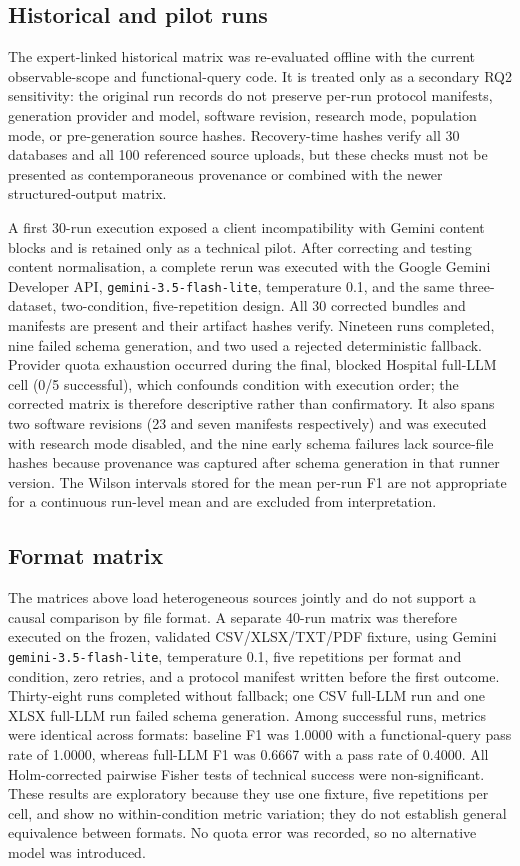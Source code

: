 \documentclass[11pt,a4paper]{article}
\begin{document}
\subsection{Historical and pilot runs}
The expert-linked historical matrix was re-evaluated offline with the current observable-scope and functional-query code. It is treated only as a secondary RQ2 sensitivity: the original run records do not preserve per-run protocol manifests, generation provider and model, software revision, research mode, population mode, or pre-generation source hashes. Recovery-time hashes verify all 30 databases and all 100 referenced source uploads, but these checks must not be presented as contemporaneous provenance or combined with the newer structured-output matrix.

A first 30-run execution exposed a client incompatibility with Gemini content blocks and is retained only as a technical pilot. After correcting and testing content normalisation, a complete rerun was executed with the Google Gemini Developer API, \texttt{gemini-3.5-flash-lite}, temperature 0.1, and the same three-dataset, two-condition, five-repetition design. All 30 corrected bundles and manifests are present and their artifact hashes verify. Nineteen runs completed, nine failed schema generation, and two used a rejected deterministic fallback. Provider quota exhaustion occurred during the final, blocked Hospital full-LLM cell (0/5 successful), which confounds condition with execution order; the corrected matrix is therefore descriptive rather than confirmatory. It also spans two software revisions (23 and seven manifests respectively) and was executed with research mode disabled, and the nine early schema failures lack source-file hashes because provenance was captured after schema generation in that runner version. The Wilson intervals stored for the mean per-run F1 are not appropriate for a continuous run-level mean and are excluded from interpretation.

\subsection{Format matrix}
The matrices above load heterogeneous sources jointly and do not support a causal comparison by file format. A separate 40-run matrix was therefore executed on the frozen, validated CSV/XLSX/TXT/PDF fixture, using Gemini \texttt{gemini-3.5-flash-lite}, temperature 0.1, five repetitions per format and condition, zero retries, and a protocol manifest written before the first outcome. Thirty-eight runs completed without fallback; one CSV full-LLM run and one XLSX full-LLM run failed schema generation. Among successful runs, metrics were identical across formats: baseline F1 was 1.0000 with a functional-query pass rate of 1.0000, whereas full-LLM F1 was 0.6667 with a pass rate of 0.4000. All Holm-corrected pairwise Fisher tests of technical success were non-significant. These results are exploratory because they use one fixture, five repetitions per cell, and show no within-condition metric variation; they do not establish general equivalence between formats. No quota error was recorded, so no alternative model was introduced.
\end{document}
